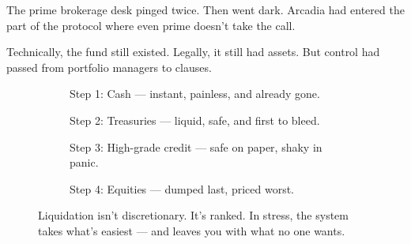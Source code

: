 The prime brokerage desk pinged twice.
Then went dark.
Arcadia had entered the part of the protocol where even prime doesn’t take the call.

Technically, the fund still existed.
Legally, it still had assets.
But control had passed from portfolio managers to clauses.


\medskip

\begin{figure}[H]
  \centering

  \begin{subfigure}[t]{0.45\textwidth}
  \centering
  \caption*{Step 1: Cash — instant, painless, and already gone.}
  \end{subfigure}
  \hfill
  \begin{subfigure}[t]{0.45\textwidth}
  \centering
  \caption*{Step 2: Treasuries — liquid, safe, and first to bleed.}
  \end{subfigure}

  \vspace{1em}

  \begin{subfigure}[t]{0.45\textwidth}
  \centering
  \caption*{Step 3: High-grade credit — safe on paper, shaky in panic.}
  \end{subfigure}
  \hfill
  \begin{subfigure}[t]{0.45\textwidth}
  \centering
  \caption*{Step 4: Equities — dumped last, priced worst.}
  \end{subfigure}

  \caption*{Liquidation isn’t discretionary. It’s ranked. In stress, the system takes what’s easiest — and leaves you with what no one wants.}
\end{figure}

